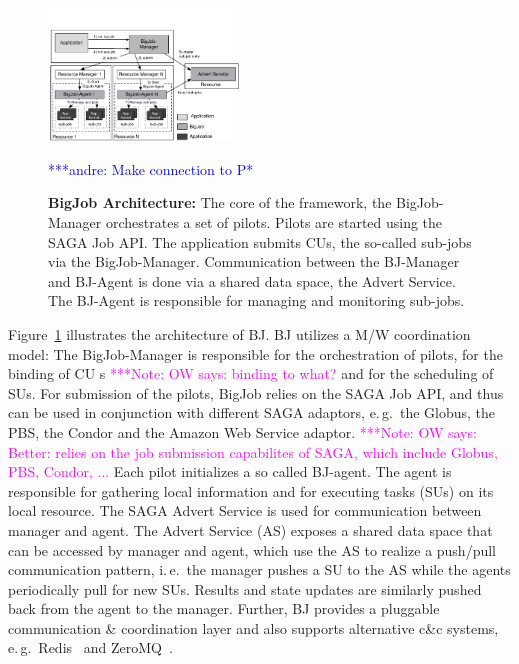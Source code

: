 \documentclass[conference,final]{IEEEtran}
\newcommand{\alnote}[1]{ {\textcolor{blue} { ***andre: #1 }}}
\newcommand{\note}[1]{ {\textcolor{magenta} { ***Note: #1 }}}
\newcommand{\alnote}[1]{}
\newcommand{\note}[1]{}
\newcommand{\cu}{CU\xspace}
\newcommand{\upp}{\vspace*{-0.5em}}
\begin{document}
\begin{figure}[t]
	\upp\upp\upp\upp
	\centering
	\includegraphics[width=0.45\textwidth]{figures/re_bigjob_interactions.pdf}
	\caption{\textbf{BigJob Architecture:} The core of the
          framework, the BigJob-Manager orchestrates a set of
          pilots. Pilots are started using the SAGA Job API. The
          application submits CUs, the so-called sub-jobs via the
          BigJob-Manager. Communication between the BJ-Manager and
          BJ-Agent is done via a shared data space, the Advert
          Service. The BJ-Agent is responsible for managing and
          monitoring sub-jobs.}
		\alnote{Make connection to P*}
	\label{fig:figures_re_bigjob_interactions}
	\upp\upp \upp
\end{figure}


Figure~\ref{fig:figures_re_bigjob_interactions} illustrates the architecture of
BJ. BJ utilizes a M/W coordination model: The BigJob-Manager is responsible for
the orchestration of pilots, for the binding of \cu s \note{OW says: binding to what?}
and for the scheduling of
SUs. For submission of the pilots, BigJob relies on the SAGA Job API, and thus can
be used in conjunction with different SAGA adaptors, e.\,g.\ the Globus, the
PBS, the Condor and the Amazon Web Service adaptor. 
\note{OW says: Better: relies on the job submission capabilites of SAGA, which include
Globus, PBS, Condor, ...}
Each pilot initializes a so
called BJ-agent. The agent is responsible for gathering local information
and for executing tasks (SUs) on its local resource. The SAGA Advert Service
is used for communication between manager and agent. The Advert Service (AS)
exposes a shared data space that can be accessed by manager and agent, which use
the AS to realize a push/pull communication pattern, i.\,e.\ the manager pushes
a SU to the AS while the agents periodically pull for new SUs. Results and state
updates are similarly pushed back from the agent to the manager. Further, BJ
provides a pluggable communication \& coordination layer and also supports
alternative c\&c systems, e.\,g.\ Redis~\cite{redis} and ZeroMQ~\cite{zmq}.
\end{document}

